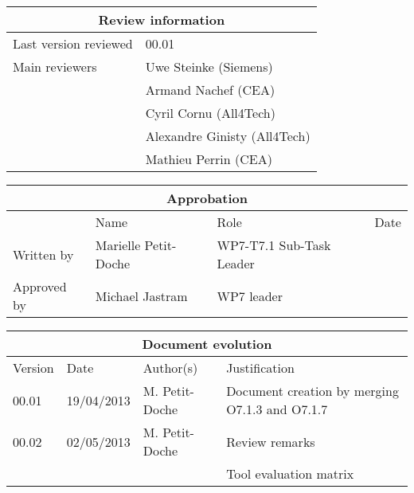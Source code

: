 \documentclass{template/openetcs_report}
\begin{document}
\begin{tabular}{|p{4.4cm}|p{8.7cm}|}
\hline
\multicolumn{2}{|c|}{Review information} \\
\hline
Last version reviewed & 00.01 \\
\hline
Main reviewers & Uwe Steinke (Siemens) \\
 & Armand Nachef (CEA) \\
 & Cyril Cornu (All4Tech) \\
 & Alexandre Ginisty (All4Tech) \\
 & Mathieu Perrin (CEA) \\
\hline
\end{tabular}

\begin{tabular}{|p{2.2cm}|p{4cm}|p{4cm}|p{2cm}|}
\hline
\multicolumn{4}{|c|}{Approbation} \\
\hline
  &  Name & Role & Date   \\
\hline  
Written by    &  Marielle Petit-Doche & WP7-T7.1 Sub-Task Leader  & \\
\hline
Approved by & Michael Jastram & WP7 leader & \\
\hline
\end{tabular}

\begin{tabular}{|p{2.2cm}|p{2cm}|p{3cm}|p{5cm}|}
\hline
\multicolumn{4}{|c|}{Document evolution} \\
\hline
Version &  Date & Author(s) & Justification  \\
\hline  
00.01 & 19/04/2013 & M. Petit-Doche &  Document creation by merging O7.1.3 and O7.1.7 \\
\hline  
00.02 & 02/05/2013 & M. Petit-Doche &  Review remarks \\
& & & Tool evaluation matrix \\
\hline  
\end{tabular}



\newcommand{\tbd}{\colorbox{cyan}{\%\%To Be Defined\%\%}}
\newcommand{\tbc}{\colorbox{cyan}{\%\%To Be Confirmed\%\%}}
\newcommand{\todo}[1]{\colorbox{cyan}{\%\%{#1}\%\%}}
\newlength{\origindent}

\newenvironment{issue}{
        \begin{quote}
        \begin{itshape}Open Issue.
}{
        \end{itshape}
        \end{quote}
}
\end{document}
